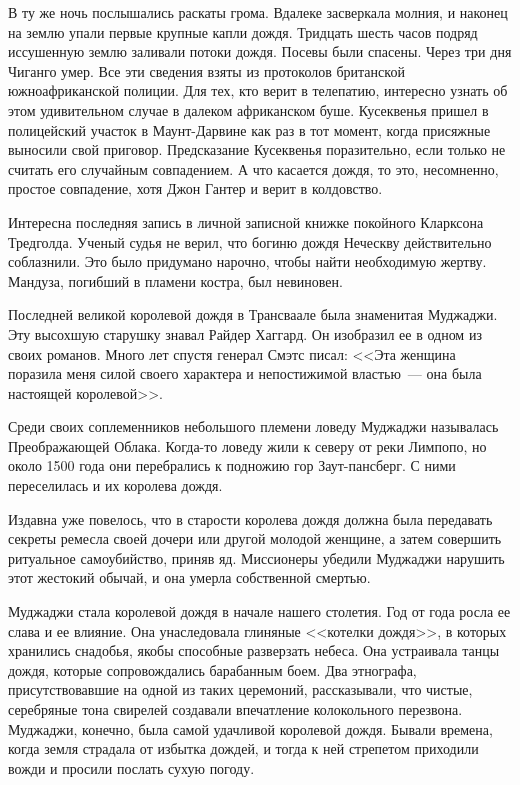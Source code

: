 \documentclass[12pt,a4paper,twoside,openany,svgnames]{memoir}
\begin{document}
В ту же ночь послышались раскаты грома. Вдалеке засверкала молния, и наконец на землю упали первые крупные капли дождя. Тридцать шесть часов подряд иссушенную землю заливали потоки дождя. Посевы были спасены. Через три дня Чиганго умер. Все эти сведения взяты из протоколов британской южноафриканской полиции. Для тех, кто верит в телепатию, интересно узнать об этом удивительном случае в далеком африканском буше. Кусеквенья пришел в полицейский участок в Маунт-Дарвине как раз в тот момент, когда присяжные выносили свой приговор. Предсказание Кусеквенья поразительно, если только не считать его случайным совпадением. А что касается дождя, то это, несомненно, простое совпадение, хотя Джон Гантер и верит в колдовство.

Интересна последняя запись в личной записной книжке покойного Кларксона Тредголда. Ученый судья не верил, что богиню дождя Неческву действительно соблазнили. Это было придумано нарочно, чтобы найти необходимую жертву. Мандуза, погибший в пламени костра, был невиновен.

Последней великой королевой дождя в Трансваале была знаменитая Муджаджи. Эту высохшую старушку знавал Райдер Хаггард. Он изобразил ее в одном из своих романов. Много лет спустя генерал Смэтс писал: <<Эта женщина поразила меня силой своего характера и непостижимой властью~--- она была настоящей королевой>>.

Среди своих соплеменников небольшого племени ловеду Муджаджи называлась Преображающей Облака. Когда-то ловеду жили к северу от реки Лимпопо, но около 1500 года они перебрались к подножию гор Заут-пансберг. С ними переселилась и их королева дождя.

Издавна уже повелось, что в старости королева дождя должна была передавать секреты ремесла своей дочери или другой молодой женщине, а затем совершить ритуальное самоубийство, приняв яд. Миссионеры убедили Муджаджи нарушить этот жестокий обычай, и она умерла собственной смертью.

Муджаджи стала королевой дождя в начале нашего столетия. Год от года росла ее слава и ее влияние. Она унаследовала глиняные <<котелки дождя>>, в которых хранились снадобья, якобы способные разверзать небеса. Она устраивала танцы дождя, которые сопровождались барабанным боем. Два этнографа, присутствовавшие на одной из таких церемоний, рассказывали, что чистые, серебряные тона свирелей создавали впечатление колокольного перезвона. Муджаджи, конечно, была самой удачливой королевой дождя. Бывали времена, когда земля страдала от избытка дождей, и тогда к ней стрепетом приходили вожди и просили послать сухую погоду.
\end{document}

